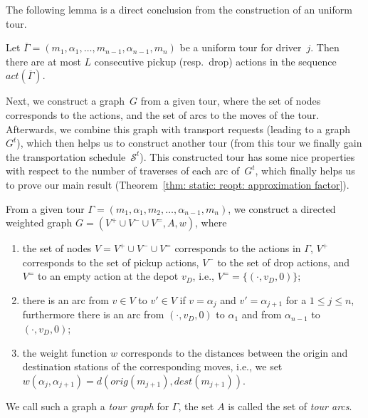 \documentclass[english]{llncs}
\numberwithin{sublemma}{lemma}
\newcommand{\orig}{\ensuremath{orig}}
\newcommand{\dest}{\ensuremath{dest}}
\newcommand{\ntourd}{\ensuremath{n}}
\newcommand{\capd}{\ensuremath{L}}
\newcommand{\tourd}{\ensuremath{\Gamma}}
\newcommand{\action}{\ensuremath{\alpha}}
\newcommand{\move}{\ensuremath{m}}
\newcommand{\tact}{\ensuremath{act}}
\newcommand{\sched}{\mathcal{S}}
\newcommand{\Vpick}{{V^+}}
\newcommand{\Vdrop}{{V^-}}
\newcommand{\Vbal}{{V^=}}
\begin{document}
The following lemma is a direct conclusion from the construction of an uniform tour.

\begin{lemma}\label{lem: static: reopt: max consecutive actions}
  Let $\overline{\tourd} = (\move_1, \action_1, \dotsc, \move_{\ntourd - 1}, \action_{\ntourd - 1}, \move_{\ntourd})$ be a uniform tour for driver~$j$.
  Then there are at most $\capd$ consecutive pickup (resp.~drop) actions in the sequence $\tact(\overline{\tourd})$.
\end{lemma}





Next, we construct a graph~$G$ from a given tour, where the set of nodes corresponds to the actions, and the set of arcs to the moves of the tour.
Afterwards, we combine this graph with transport requests (leading to a graph~$G^t$), which then helps us to construct another tour (from this tour we finally gain the transportation schedule~$\sched^t$).
This constructed tour has some nice properties with respect to the number of traverses of each arc of~$G^t$, which finally helps us to prove our main result (Theorem~\ref{thm: static: reopt: approximation factor}).


From a given tour $\tourd = (\move_1, \action_1, \move_2, \dotsc, \action_{\ntourd-1}, \move_{\ntourd})$, we construct a directed weighted graph $G = (\Vpick \cup \Vdrop \cup \Vbal, A, w)$, where
\begin{enumerate}
 \item the set of nodes $V = \Vpick \cup \Vdrop \cup \Vbal$ corresponds to the actions in $\tourd$, $\Vpick$ corresponds to the set of pickup actions, $\Vdrop$ to the set of drop actions, and $\Vbal$ to an empty action at the depot $v_D$, i.e., $\Vbal = \{ (\cdot, v_D, 0) \}$;
\item there is an arc from $v \in V$ to $v' \in V$ if $v = \action_j$ and $v' = \action_{j+1}$ for a $1 \leq j \leq \ntourd$, furthermore there is an arc from $(\cdot, v_D, 0)$ to $\action_1$ and from $\action_{\ntourd - 1}$ to $(\cdot, v_D, 0)$;
 \item the weight function $w$ corresponds to the distances between the origin and destination stations of the corresponding moves, i.e., we set $w(\action_j, \action_{j+1}) = d(\orig(\move_{j+1}), \dest(\move_{j+1}))$.
\end{enumerate}
We call such a graph a \emph{tour graph} for $\tourd$, the set $A$ is called the set of \emph{tour arcs}.
\end{document}

